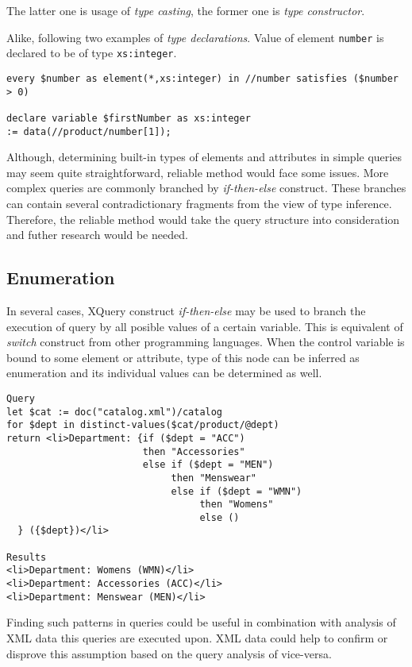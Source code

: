 The latter one is usage of \emph{type casting}, the former one is \emph{type constructor}.

Alike, following two examples of \emph{type declarations}. Value of element \texttt{number} is declared to be of type \texttt{xs:integer}.

\begin{verbatim}
every $number as element(*,xs:integer) in //number satisfies ($number > 0) 

declare variable $firstNumber as xs:integer 
:= data(//product/number[1]); 
\end{verbatim}

Although, determining built-in types of elements and attributes in simple queries may seem quite straightforward, reliable method would face some issues. More complex queries are commonly branched by \emph{if-then-else} construct. These branches can contain several contradictionary fragments from the view of type inference. Therefore, the reliable method would take the query structure into consideration and futher research would be needed.

\subsection{Enumeration}
In several cases, XQuery construct \emph{if-then-else} may be used to branch the execution of query by all posible values of a certain variable. This is equivalent of \emph{switch} construct from other programming languages. When the control variable is bound to some element or attribute, type of this node can be inferred as enumeration and its individual values can be determined as well.

\begin{verbatim}
Query
let $cat := doc("catalog.xml")/catalog 
for $dept in distinct-values($cat/product/@dept) 
return <li>Department: {if ($dept = "ACC") 
                        then "Accessories" 
                        else if ($dept = "MEN") 
                             then "Menswear" 
                             else if ($dept = "WMN") 
                                  then "Womens" 
                                  else () 
  } ({$dept})</li> 

Results 
<li>Department: Womens (WMN)</li> 
<li>Department: Accessories (ACC)</li> 
<li>Department: Menswear (MEN)</li> 
\end{verbatim}

Finding such patterns in queries could be useful in combination with analysis of XML data this queries are executed upon. XML data could help to confirm or disprove this assumption based on the query analysis of vice-versa.